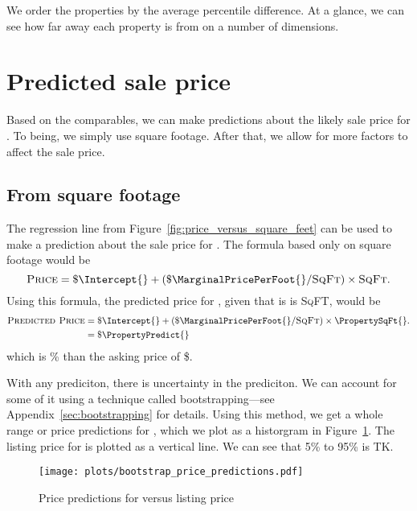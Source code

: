 \documentclass[
12pt, %
letterpaper, %
oneside, %
headinclude,footinclude, %
BCOR5mm, %
]{scrartcl}
\begin{document}
We order the properties by the average percentile difference.
At a glance, we can see how far away each property is from \PropertyName{} on a number of dimensions. 

\section{Predicted sale price}
Based on the comparables, we can make predictions about the likely sale price for \PropertyName{}. 
To being, we simply use square footage.
After that, we allow for more factors to affect the sale price.

\subsection{From square footage}

The regression line from Figure~\ref{fig:price_versus_square_feet} can be used to make a prediction about the sale price for \PropertyName{}. 
The formula based only on square footage would be
\begin{equation}
  \textsc{Price} = \$ \Intercept{} + (\$ \MarginalPricePerFoot{}/\textsc{SqFt}) \times \textsc{SqFt}. \nonumber
\end{equation}
Using this formula, the predicted price for \PropertyName{}, given that is is \PropertySqFt{} \textsc{SqFT}, would be
\begin{align}
\textsc{Predicted Price} & = \$ \Intercept{} + (\$ \MarginalPricePerFoot{}/\textsc{SqFt}) \times \PropertySqFt{}. \\ \nonumber
                         & = \$ \PropertyPredict{} \nonumber 
\end{align}
which is \PctDiff{}\% \ComparePredictedToActual{} than the asking price of \$\PropertyPrice{}.

With any prediciton, there is uncertainty in the prediciton.
We can account for some of it using a technique called bootstrapping---see Appendix~\ref{sec:bootstrapping} for details. 
Using this method, we get a whole range or price predictions for \PropertyName{}, which we plot as a historgram in Figure~\ref{fig:bootstrap_price_predictions}.
The listing price for \PropertyName{} is plotted as a vertical line. 
We can see that 5\% to 95\% is TK.

\begin{figure}
\centering
\caption{Price predictions for \PropertyName{} versus listing price} \label{fig:bootstrap_price_predictions}  
\texttt{[image: plots/bootstrap\_price\_predictions.pdf]} 
\end{figure}
\end{document}
